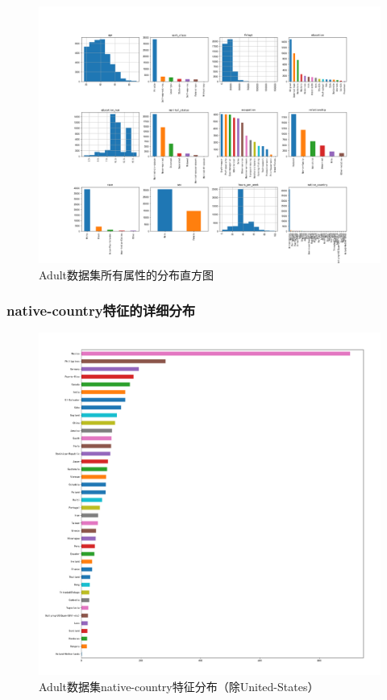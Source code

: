 \documentclass[12pt,a4paper]{article}
\theoremstyle{definition}
\begin{document}
\begin{appendix}
	\vspace{-0.02\linewidth}
	\begin{figure}[H]
		\centering
		\includegraphics[width=0.97\linewidth]{img/all_features.png}
		\caption{Adult数据集所有属性的分布直方图}
		\label{fig:all_features}
	\end{figure}
	
	\subsubsection{native-country特征的详细分布}
	\label{apd:native-country}
	
	\vspace{-0.02\linewidth}
	\begin{figure}[H]
		\centering
		\includegraphics[width=0.80\linewidth]{img/native_country_dis2.pdf}
		\caption{Adult数据集native-country特征分布（除United-States）}
		\label{fig:class_feature_dis_detail}
	\end{figure}
	

\end{appendix}
\end{document}

